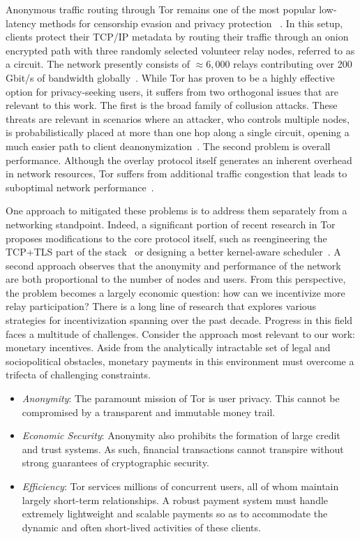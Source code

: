 Anonymous traffic routing through Tor remains one of the most popular
low-latency methods for censorship evasion and privacy protection
~\cite{dingledine2004tor}. In this setup, clients protect their TCP/IP metadata
by routing their traffic through an onion encrypted path with three
randomly selected volunteer relay nodes, referred to as a circuit. The network
presently consists of $\approx 6,000$ relays contributing over 200 Gbit/s of
bandwidth globally~\cite{portal2018tormetrics}. While Tor has proven to be a
highly effective option for privacy-seeking users, it suffers from two
orthogonal issues that are relevant to this work. The first is the broad family
of collusion attacks. These threats are relevant in scenarios where an attacker,
who controls multiple nodes, is probabilistically placed at more than one hop
along a single circuit, opening a much easier path to client
deanonymization~\cite{wright2004predecessor,murdoch2005low}. The second
problem is overall performance. Although the overlay protocol itself generates
an inherent overhead in network resources, Tor suffers from additional traffic
congestion that leads to suboptimal network
performance~\cite{portal2018tormetrics, alsabah2016performance}.

One approach to mitigated these problems is to address them separately from a
networking standpoint. Indeed, a significant portion of recent research in Tor
proposes modifications to the core protocol itself, such as reengineering the
TCP+TLS part of the stack~\cite{reardon2009improving} or designing a better
kernel-aware scheduler~\cite{jansen2014never}. A second approach observes that
the anonymity and performance of the network are both proportional to the number
of nodes and users. From this perspective, the problem becomes a largely
economic question: how can we incentivize more relay participation? There is a
long line of research that explores various strategies for incentivization
spanning over the past decade. Progress in this field faces a multitude of
challenges. Consider the approach most relevant to our work: monetary
incentives. Aside from the analytically intractable set of legal and
sociopolitical obstacles, monetary payments in this environment must overcome a
trifecta of challenging constraints.

\begin{itemize}
\item \emph{Anonymity}: The paramount mission of Tor is user privacy. This
  cannot be compromised by a transparent and immutable money trail.
\item \emph{Economic Security}: Anonymity also prohibits the formation of large
  credit and trust systems. As such, financial transactions cannot transpire
  without strong guarantees of cryptographic security.
\item \emph{Efficiency}: Tor services millions of concurrent users, all of whom
  maintain largely short-term relationships. A robust payment system must handle
  extremely lightweight and scalable payments so as to accommodate the dynamic
  and often short-lived activities of these clients.
\end{itemize}

